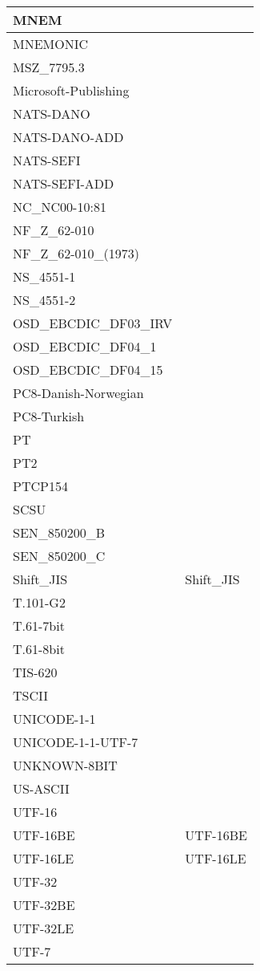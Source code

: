 \documentclass{wg21}
\begin{document}
\begin{longtable}{| p{} | p{} |}
MNEM & \\ \hline
MNEMONIC & \\ \hline
MSZ_7795.3 & \\ \hline
Microsoft-Publishing & \\ \hline
NATS-DANO & \\ \hline
NATS-DANO-ADD & \\ \hline
NATS-SEFI & \\ \hline
NATS-SEFI-ADD & \\ \hline
NC_NC00-10:81 & \\ \hline
NF_Z_62-010 & \\ \hline
NF_Z_62-010_(1973) & \\ \hline
NS_4551-1 & \\ \hline
NS_4551-2 & \\ \hline
OSD_EBCDIC_DF03_IRV & \\ \hline
OSD_EBCDIC_DF04_1 & \\ \hline
OSD_EBCDIC_DF04_15 & \\ \hline
PC8-Danish-Norwegian & \\ \hline
PC8-Turkish & \\ \hline
PT & \\ \hline
PT2 & \\ \hline
PTCP154 & \\ \hline
SCSU & \\ \hline
SEN_850200_B & \\ \hline
SEN_850200_C & \\ \hline
Shift_JIS & Shift_JIS\\ \hline
T.101-G2 & \\ \hline
T.61-7bit & \\ \hline
T.61-8bit & \\ \hline
TIS-620 & \\ \hline
TSCII & \\ \hline
UNICODE-1-1 & \\ \hline
UNICODE-1-1-UTF-7 & \\ \hline
UNKNOWN-8BIT & \\ \hline
US-ASCII & \\ \hline
UTF-16 & \\ \hline
UTF-16BE & UTF-16BE\\ \hline
UTF-16LE & UTF-16LE\\ \hline
UTF-32 & \\ \hline
UTF-32BE & \\ \hline
UTF-32LE & \\ \hline
UTF-7 & \\ \hline

\end{longtable}
\end{document}
